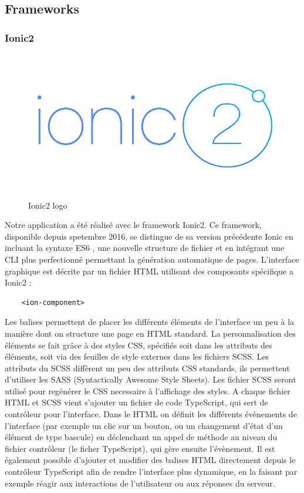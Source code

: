 \documentclass[french]{article}
\begin{document}
	\subsection{Frameworks}
	
	\subsubsection{Ionic2}
	
	\begin{figure}[H]
		\centering
		\includegraphics[scale=0.45]{../images/ionic2-logo.png}
		\caption{Ionic2 logo}
		\label{Ionic2 logo}
	\end{figure} 
	
	Notre application a été réalisé avec le framework Ionic2. Ce framework, disponible depuis spetembre 2016, se distingue de sa version précédente Ionic en incluant la syntaxe ES6 , une nouvelle structure de fichier et en intégrant une CLI plus perfectionné permettant la génération automatique de pages.
	L’interface graphique est décrite par un fichier HTML utilisant des composants spécifique a Ionic2 :
	
	\lstset{language = HTML5}
	\begin{lstlisting}
	<ion-component>
	\end{lstlisting}
	
	Les balises permettent de placer les différents éléments de l’interface un peu à la manière dont on structure une page en HTML standard. La personnalisation des éléments se fait grâce à des styles CSS, spécifiés soit dans les attributs des éléments, soit via des feuilles de style externes dans les fichiers SCSS. Les attributs du SCSS diffèrent un peu des attributs CSS standards, ils permettent d'utiliser les SASS (Syntactically Awesome Style Sheets). Les fichier SCSS seront utilisé pour regénérer le CSS necessaire à l'affichage des styles. 
	A chaque fichier HTML et SCSS vient s’ajouter un fichier de code TypeScript, qui sert de contrôleur pour l’interface. Dans le HTML on définit les différents évènements de l’interface (par exemple un clic sur un bouton, ou un changement d'état d'un élément de type bascule) en déclenchant un appel de méthode au niveau du fichier contrôleur (le ficher TypeScript), qui gère ensuite l’évènement. Il est également possible d’ajouter et modifier des balises HTML directement depuis le contrôleur TypeScript afin de rendre l’interface plus dynamique, en la faisant par exemple réagir aux interactions de l’utilisateur ou aux réponses du serveur. 
	
\end{document}
